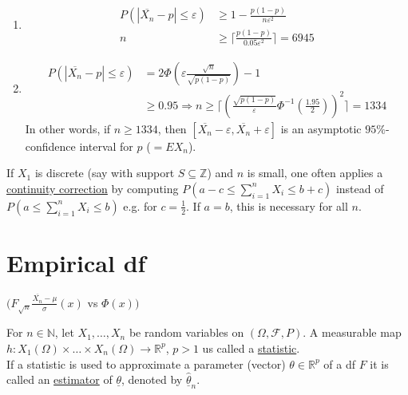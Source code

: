 \documentclass{article}
\newcommand{\R}{\mathbb{R}}
\newcommand{\N}{\mathbb{N}}
\newcommand{\Z}{\mathbb{Z}}
\newcommand{\inv}{^{-1}}
\begin{document}
\begin{myex}{}{}
\begin{enumerate}
\begin{enumerate}[label=(\alph*)]
						\begin{enumerate}[label=(\alph*)]
							\item
							\begin{align*}
								P(|\overline{X_n}-p|\leq\varepsilon)&\geq1-\frac{p(1-p)}{n\varepsilon^2}\\
								n&\geq\lceil\frac{p(1-p)}{0.05\varepsilon^2}\rceil=6945
							\end{align*}
							\item
							\begin{align*}
								P(|\overline{X_n}-p|\leq\varepsilon)&=2\Phi(\varepsilon\frac{\sqrt{n}}{\sqrt{p(1-p)}})-1\\
								&\geq0.95
								\Rightarrow n\geq\lceil(\frac{\sqrt{p(1-p)}}{\varepsilon}\Phi\inv(\frac{1.95}{2}))^2\rceil=1334
							\end{align*}
							In other words, if $n\geq1334$, then $[\overline{X_n}-\varepsilon, \overline{X_n}+\varepsilon]$ is an asymptotic $95\%$-confidence interval for $p$ ($=EX_n$).
						\end{enumerate}
					\end{enumerate}
				\end{enumerate}
			\end{myex}
			
			\begin{myrem}{}{}
				If $X_1$ is discrete (say with support $S\subseteq\Z$) and $n$ is small, one often applies a \ul{continuity correction} by computing $P(a-c\leq\sum_{i=1}^nX_i\leq b+c)$ instead of $P(a\leq\sum_{i=1}^nX_i\leq b)$ e.g. for $c=\frac{1}{2}$. If $a=b$, this is necessary for all $n$.
			\end{myrem}
			
			\section{Empirical df}
			$(F_{\sqrt{n}}\frac{\overline{X_n}-\mu}{\sigma}(x)$ vs $\Phi(x))$
			
			For $n\in\N$, let $X_1, \dots, X_n$ be random variables on $(\Omega, \mathcal{F}, P)$. A measurable map $h : X_1(\Omega)\times\dots\times X_n(\Omega)\to\R^p$, $p>1$ us called a \ul{statistic}.\\
			
			If a statistic is used to approximate a parameter (vector) $\theta\in\R^p$ of a df $F$ it is called an \ul{estimator} of $\underline{\theta}$, denoted by $\hat{\underline{\theta}}_n$.\\
			
\end{document}
